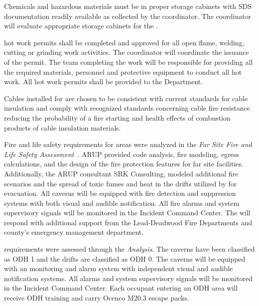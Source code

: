 Chemicals and hazardous materials must be in proper storage cabinets
with SDS documentation readily available as collected by the
  coordinator. The
  coordinator will evaluate
appropriate storage cabinets for the .

\fnal hot work permits shall be completed and approved for all open
flame, welding, cutting or grinding work activities.  The 
 coordinator will coordinate the issuance of the permit.
The team completing the work will be responsible for
providing all the required materials, personnel and protective
equipment to conduct all hot work. All hot work permits shall be
provided to the   Department.

Cables installed for  are chosen to be
consistent with current \fnal standards for cable insulation and
comply with recognized standards concerning cable fire resistance
reducing the probability of a fire starting and health effects of
combustion products of cable insulation materials.

Fire and life safety requirements for  areas were
analyzed in the {\it {} Far Site Fire and Life Safety
  Assessment}~. ARUP provided code analysis, fire
modeling, egress calculations, and the design of the fire protection
features for  far site facilities.  Additionally, the ARUP
consultant SRK Consulting, modeled additional fire scenarios and the
spread of toxic fumes and heat in the drifts utilized by
 for evacuation.  All caverns will be equipped with
fire detection and suppression systems with both visual and audible
notification.  All fire alarms and system supervisory signals will be
monitored in the  Incident Command Center.  The
  will respond with additional support from the
Lead-Deadwood Fire Departments and county’s emergency management
department.

 requirements were assessed through the {\it {}
 Analysis}. The caverns have been classified as ODH 1 and
the drifts are classified as ODH 0. The caverns will be equipped with
an  monitoring and alarm system with independent visual and
audible notification systems.  All  alarms and system
supervisory signals will be monitored in the  Incident
Command Center.  Each occupant entering an ODH area will receive ODH
training and carry Ocenco M20.3 escape packs.

